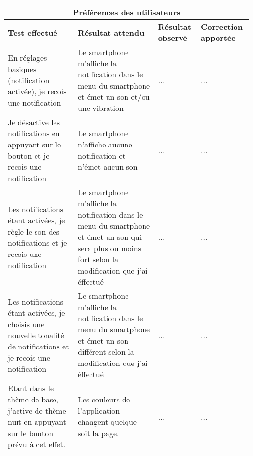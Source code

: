 \documentclass{article}
\begin{document}
  \begin{center}
    \begin{tabular}{|p{4cm}|p{4cm}|p{4cm}|p{4cm}|}
      \hline
      \multicolumn{4}{|c|}{\textbf{Préférences des utilisateurs}} \\
      \hline
      \textbf{Test effectué} & \textbf{Résultat attendu} & \textbf{Résultat observé} & \textbf{Correction apportée} \\
      \hline

      En réglages basiques (notification activée), je recois une notification&
      Le smartphone m'affiche la notification dans le menu du smartphone et émet un son et/ou une vibration&
      ...&
      ... \\

      \hline
      \hline
      Je désactive les notifications en appuyant sur le bouton et je recois une notification&
      Le smartphone n'affiche aucune notification et n'émet aucun son&
      ...&
      ... \\


      \hline
      \hline
      Les notifications étant activées, je règle le son des notifications et je recois une notification&
      Le smartphone m'affiche la notification dans le menu du smartphone et émet un son qui sera plus ou moins fort selon la modification que j'ai éffectué&
      ...&
      ... \\

      \hline
      \hline
      Les notifications étant activées, je choisis une nouvelle tonalité de notifications et je recois une notification&
      Le smartphone m'affiche la notification dans le menu du smartphone et émet un son différent selon la modification que j'ai éffectué&

      ...&
      ... \\
 

      \hline
      \hline
      Etant dans le thème de base, j'active de thème nuit en appuyant sur le bouton prévu à cet effet.&
      Les couleurs de l'application changent quelque soit la page.&
      ...&
      ... \\



      \hline

    \end{tabular}
  \end{center}
\end{document}
